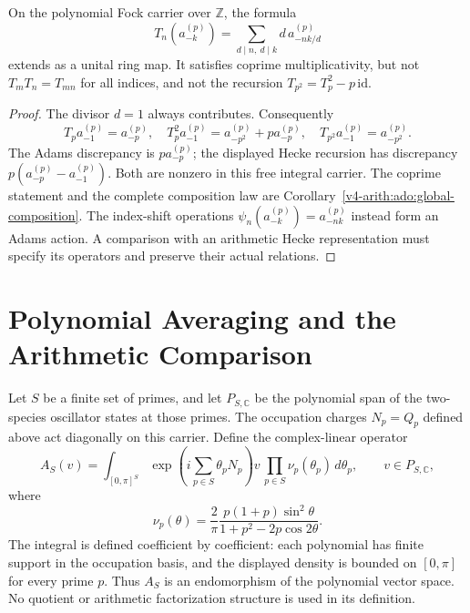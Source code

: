 \begin{proposition}
\label{v4-arith:claim:hecke-adams-naive}
On the polynomial Fock carrier over \(\mathbb Z\), the formula
\[
 T_n(a^{(p)}_{-k})=\sum_{d\mid n,\ d\mid k}d\,a^{(p)}_{-nk/d}
\]
extends as a unital ring map. It satisfies coprime multiplicativity,
but not \(T_mT_n=T_{mn}\) for all indices, and not the recursion
\(T_{p^2}=T_p^2-p\,\mathrm{id}\).
\end{proposition}
\begin{proof}
The divisor \(d=1\) always contributes. Consequently
\[
 T_p a^{(p)}_{-1}=a^{(p)}_{-p},\quad
 T_p^2a^{(p)}_{-1}=a^{(p)}_{-p^2}+p a^{(p)}_{-p},\quad
 T_{p^2}a^{(p)}_{-1}=a^{(p)}_{-p^2}.
\]
The Adams discrepancy is \(p a^{(p)}_{-p}\); the displayed Hecke
recursion has discrepancy \(p(a^{(p)}_{-p}-a^{(p)}_{-1})\).
Both are nonzero in this free integral carrier. The coprime statement
and the complete composition law are
Corollary~\ref{v4-arith:ado:global-composition}. The index-shift operations
\(\psi_n(a^{(p)}_{-k})=a^{(p)}_{-nk}\) instead form an Adams action.
A comparison with an arithmetic Hecke representation must specify its
operators and preserve their actual relations.
\end{proof}

\section{Polynomial Averaging and the Arithmetic Comparison}
\label{v4-arith:construction:averaging-naive}

\begin{definition}
\label{v4-arith:def:averaging-naive}
Let \(S\) be a finite set of primes, and let \(P_{S,\mathbb C}\) be
the polynomial span of the two-species oscillator states at those
primes. The occupation charges \(N_p=Q_p\) defined above act
diagonally on this carrier. Define the complex-linear operator
\begin{equation}
 A_S(v)=\int_{[0,\pi]^S}
 \exp\!\left(i\sum_{p\in S}\theta_pN_p\right)v\,
 \prod_{p\in S}\nu_p(\theta_p)\,d\theta_p,
 \qquad v\in P_{S,\mathbb C},
\end{equation}
where
\[
 \nu_p(\theta)=\frac{2}{\pi}
 \frac{p(1+p)\sin^2\theta}{1+p^2-2p\cos2\theta}.
\]
The integral is defined coefficient by coefficient: each polynomial
has finite support in the occupation basis, and the displayed density
is bounded on \([0,\pi]\) for every prime \(p\). Thus \(A_S\)
is an endomorphism of the polynomial vector space. No quotient or
arithmetic factorization structure is used in its definition.
\end{definition}

